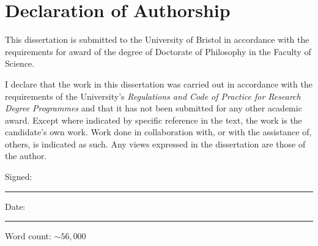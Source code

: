 \chapter*{Declaration of Authorship}

This dissertation is submitted to the University of Bristol
in accordance with the requirements for award of the degree of 
Doctorate of Philosophy in the Faculty of Science.
\vspace{2cm}

I declare that the work in this dissertation was carried out in accordance with the 
requirements of the University's \emph{Regulations and Code of Practice for Research Degree Programmes}
and that it has not been submitted for any other academic award. 
Except where indicated by specific reference in the text, the work is the candidate's own work. 
Work done in collaboration with, or with the assistance of, others, is indicated as such. 
Any views expressed in the dissertation are those of the author.

\vspace{1.5cm}
Signed: 
\begin{center}
    \rule{12cm}{0.25mm}
\end{center}

\vspace{1.5cm}
Date: 
\begin{center}
    \rule{12cm}{0.25mm}
\end{center}


\vspace{4cm}
\begin{flushright}
    \small{Word count: ${\sim}56,000$}
\end{flushright}
